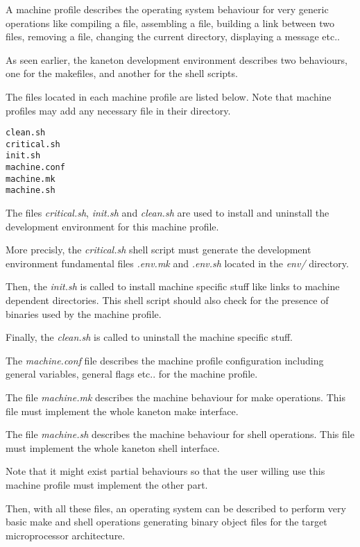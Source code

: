 A machine profile describes the operating system behaviour for very
generic operations like compiling a file, assembling a file, building
a link between two files, removing a file, changing the current directory,
displaying a message etc..

As seen earlier, the kaneton development environment describes two
behaviours, one for the makefiles, and another for the shell scripts.

The files located in each machine profile are listed below. Note that
machine profiles may add any necessary file in their directory.

\begin{verbatim}
clean.sh
critical.sh
init.sh
machine.conf
machine.mk
machine.sh
\end{verbatim}

The files \textit{critical.sh}, \textit{init.sh} and \textit{clean.sh} are
used to install and uninstall the development environment for this
machine profile.

More precisly, the \textit{critical.sh} shell script must generate
the development environment fundamental files \textit{.env.mk} and
\textit{.env.sh} located in the \textit{env/} directory.

Then, the \textit{init.sh} is called to install machine specific stuff
like links to machine dependent directories. This shell script should also
check for the presence of binaries used by the machine profile.

Finally, the \textit{clean.sh} is called to uninstall the machine
specific stuff.

The \textit{machine.conf} file describes the machine profile configuration
including general variables, general flags etc.. for the machine profile.

The file \textit{machine.mk} describes the machine behaviour for
make operations. This file must implement the whole kaneton make interface.

The file \textit{machine.sh} describes the machine behaviour for
shell operations. This file must implement the whole kaneton shell
interface.

Note that it might exist partial behaviours so that the user willing use
this machine profile must implement the other part.

Then, with all these files, an operating system can be described to
perform very basic make and shell operations generating binary object
files for the target microprocessor architecture.

